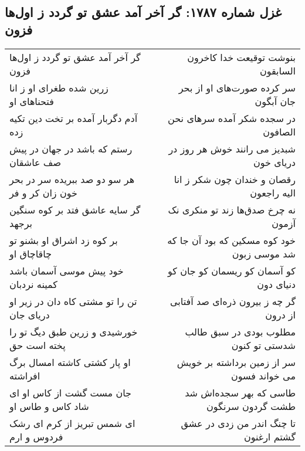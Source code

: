 \begin{center}
\section*{غزل شماره ۱۷۸۷: گر آخر آمد عشق تو گردد ز اول‌ها فزون}
\label{sec:1787}
\begin{longtable}{l p{0.5cm} r}
گر آخر آمد عشق تو گردد ز اول‌ها فزون
&&
بنوشت توقیعت خدا کاخرون السابقون
\\
زرین شده طغرای او ز انا فتحناهای او
&&
سر کرده صورت‌های او از بحر جان آبگون
\\
آدم دگربار آمده بر تخت دین تکیه زده
&&
در سجده شکر آمده سرهای نحن الصافون
\\
رستم که باشد در جهان در پیش صف عاشقان
&&
شبدیز می رانند خوش هر روز در دریای خون
\\
هر سو دو صد ببریده سر در بحر خون زان کر و فر
&&
رقصان و خندان چون شکر ز انا الیه راجعون
\\
گر سایه عاشق فتد بر کوه سنگین برجهد
&&
نه چرخ صدق‌ها زند تو منکری نک آزمون
\\
بر کوه زد اشراق او بشنو تو چاقاچاق او
&&
خود کوه مسکین که بود آن جا که شد موسی زبون
\\
خود پیش موسی آسمان باشد کمینه نردبان
&&
کو آسمان کو ریسمان کو جان کو دنیای دون
\\
تن را تو مشتی کاه دان در زیر او دریای جان
&&
گر چه ز بیرون ذره‌ای صد آفتابی از درون
\\
خورشیدی و زرین طبق دیگ تو را پخته است حق
&&
مطلوب بودی در سبق طالب شدستی تو کنون
\\
او پار کشتی کاشته امسال برگ افراشته
&&
سر از زمین برداشته بر خویش می خواند فسون
\\
جان مست گشت از کاس او ای شاد کاس و طاس او
&&
طاسی که بهر سجده‌اش شد طشت گردون سرنگون
\\
ای شمس تبریز از کرم ای رشک فردوس و ارم
&&
تا چنگ اندر من زدی در عشق گشتم ارغنون
\\
\end{longtable}
\end{center}
